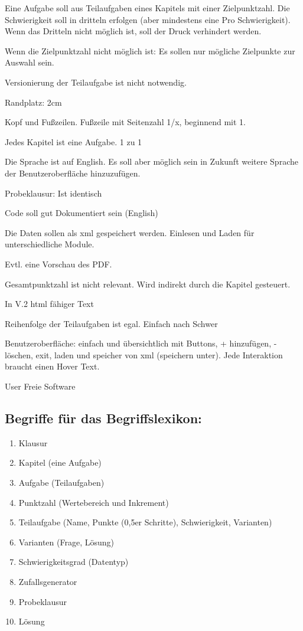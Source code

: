 \documentclass[a4paper]{article}
\begin{document}
Eine Aufgabe soll aus Teilaufgaben eines Kapitels mit einer Zielpunktzahl. Die Schwierigkeit soll in dritteln erfolgen (aber mindestens eine Pro Schwierigkeit). Wenn das Dritteln nicht möglich ist, soll der Druck verhindert werden.

Wenn die Zielpunktzahl nicht möglich ist: Es sollen nur mögliche Zielpunkte zur Auswahl sein.

Versionierung der Teilaufgabe ist nicht notwendig.

Randplatz: 2cm

Kopf und Fußzeilen. Fußzeile mit Seitenzahl 1/x, beginnend mit 1.

Jedes Kapitel ist eine Aufgabe. 1 zu 1

Die Sprache ist auf English. Es soll aber möglich sein in Zukunft weitere Sprache der Benutzeroberfläche hinzuzufügen.

Probeklausur: Ist identisch 

Code soll gut Dokumentiert sein (English)

Die Daten sollen als xml gespeichert werden. Einlesen und Laden für unterschiedliche Module.

Evtl. eine Vorschau des PDF.

Gesamtpunktzahl ist nicht relevant. Wird indirekt durch die Kapitel gesteuert.

In V.2 html fähiger Text

Reihenfolge der Teilaufgaben ist egal. Einfach nach Schwer

Benutzeroberfläche: einfach und übersichtlich mit Buttons, + hinzufügen, - löschen, exit, laden und speicher von xml (speichern unter). Jede Interaktion braucht einen Hover Text.

User Freie Software


\subsection{Begriffe für das Begriffslexikon:}

\begin{enumerate}
    \item Klausur
    \item Kapitel (eine Aufgabe)
    \item Aufgabe (Teilaufgaben)
    \item Punktzahl (Wertebereich und Inkrement)
    \item Teilaufgabe (Name, Punkte (0,5er Schritte), Schwierigkeit, Varianten)
    \item Varianten (Frage, Lösung)
    \item Schwierigkeitsgrad (Datentyp)
    \item Zufallsgenerator
    \item Probeklausur
    \item Lösung
\end{enumerate}
\end{document}
